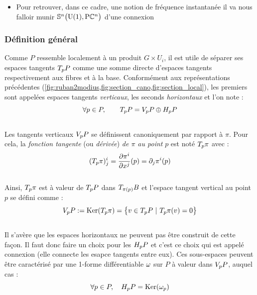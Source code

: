 \begin{itemize}
	\item Pour retrouver, dans ce cadre, une notion de fréquence instantanée il va nous falloir munir $\VFP$ d'une connexion
\end{itemize}

\subsubsection{Définition général}\label{subsec:def2conn}

Comme $P$ ressemble localement à un produit $G\times U_i$, il est utile de séparer ses espaces tangents $\tg[p]{P}$ comme une somme directe d'espaces tangents respectivement aux fibres et à la base. Conformément aux représentations précédentes (\cref{fig:ruban2modius,fig:section_cano,fig:section_local}), les premiers sont appelées espaces tangents \emph{verticaux}, les seconds \emph{horizontaux} et l'on note :
\[\forall p\in P,\qquad \tg[p]{P} = \vg[p]{P} \oplus \hg[p]{P}\]
\\
Les tangents verticaux $\vg[p]{P}$ se définissent canoniquement par rapport à $\pi$. Pour cela, la \emph{fonction tangente} (ou \emph{dérivée}) \emph{de $\pi$ au point} $p$ est noté $\tg[p]{\pi}$ avec :
\[(\tg[p]{\pi})^i_j = \frac{\partial \pi^i}{\partial x^j}(p) = \partial_j\pi^i(p)\]
\\
Ainsi, $\tg[p]{\pi}$ est à valeur de $\tg[p]{P}$ dans $\tg[\pi(p)]{B}$ et l'espace tangent vertical au point $p$ se défini comme :
\[\vg[p]{P} \defeq \Ker (\tg[p]{\pi}) = \big\{ v\in\tg[p]{P}\ |\ \tg[p]{\pi}(v)=0 \big\}\]
\\ 
Il s'avère que les espaces horizontaux ne peuvent pas être construit de cette façon. Il faut donc faire un choix pour les $\hg[p]{P}$ et c'est ce choix qui est appelé connexion (elle connecte les esapce tangents entre eux).
Ces sous-espaces peuvent être caractérisé par une 1-forme différentiable $\conn$ sur $P$ à valeur dans $\vg[p]{P}$, auquel cas :
\[\forall p\in P,\quad \hg[p]{P} = \Ker(\conn_p)\]
\skipl

